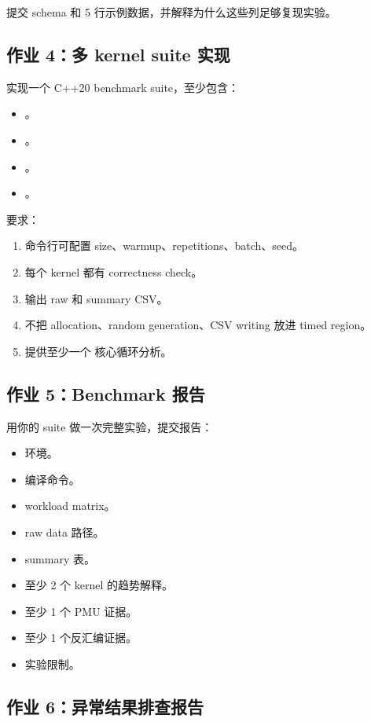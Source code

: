 \begin{exercisebox}
提交 schema 和 5 行示例数据，并解释为什么这些列足够复现实验。

\subsection*{作业 4：多 kernel suite 实现}

实现一个 C++20 benchmark suite，至少包含：

\begin{itemize}
  \item {}。
  \item {}。
  \item {}。
  \item {}。
\end{itemize}

要求：

\begin{enumerate}
  \item 命令行可配置 size、warmup、repetitions、batch、seed。
  \item 每个 kernel 都有 correctness check。
  \item 输出 raw 和 summary CSV。
  \item 不把 allocation、random generation、CSV writing 放进 timed region。
  \item 提供至少一个  核心循环分析。
\end{enumerate}

\subsection*{作业 5：Benchmark 报告}

用你的 suite 做一次完整实验，提交报告：

\begin{itemize}
  \item 环境。
  \item 编译命令。
  \item workload matrix。
  \item raw data 路径。
  \item summary 表。
  \item 至少 2 个 kernel 的趋势解释。
  \item 至少 1 个 PMU 证据。
  \item 至少 1 个反汇编证据。
  \item 实验限制。
\end{itemize}

\subsection*{作业 6：异常结果排查报告}


\end{exercisebox}

